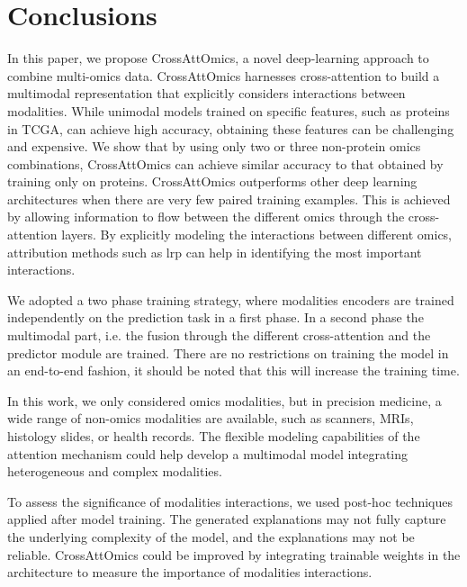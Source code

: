\documentclass[../main.tex]{subfiles}
\begin{document}
\section{Conclusions}
 In this paper, we propose CrossAttOmics, a novel deep-learning approach to combine multi-omics data.
 CrossAttOmics harnesses cross-attention to build a multimodal representation that explicitly considers interactions between modalities.
 While unimodal models trained on specific features, such as proteins in TCGA, can achieve high accuracy, obtaining these features can be challenging and expensive.
 We show that by using only two or three non-protein omics combinations, CrossAttOmics can achieve similar accuracy to that obtained by training only on proteins.
 CrossAttOmics outperforms other deep learning architectures when there are very few paired training examples.
 This is achieved by allowing information to flow between the different omics through the cross-attention layers.
 By explicitly modeling the interactions between different omics, attribution methods such as \gls{lrp} can help in identifying the most important interactions.

 We adopted a two phase training strategy, where modalities encoders are trained independently on the prediction task in a first phase.
 In a second phase the multimodal part, i.e. the fusion through the different cross-attention and the predictor module are trained.
 There are no restrictions on training the model in an end-to-end fashion, it should be noted that this will increase the training time.

 In this work, we only considered omics modalities, but in precision medicine, a wide range of non-omics modalities are available, such as scanners, MRIs, histology slides, or health records.
 The flexible modeling capabilities of the attention mechanism could help develop a multimodal model integrating heterogeneous and complex modalities.

 To assess the significance of modalities interactions, we used post-hoc techniques applied after model training.
 The generated explanations may not fully capture the underlying complexity of the model, and the explanations may not be reliable.
 CrossAttOmics could be improved by integrating trainable weights in the architecture to measure the importance of modalities interactions.
\end{document}
